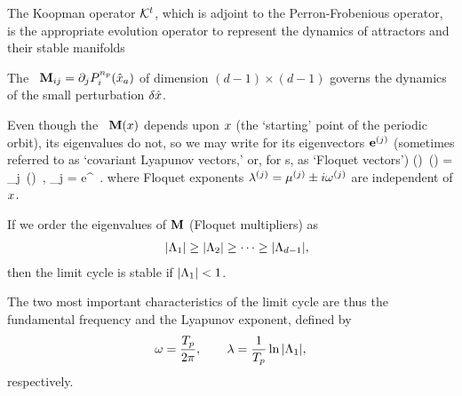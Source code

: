 The Koopman operator $\Uop^t$, which is
adjoint to the Perron-Frobenious operator, is the appropriate evolution
operator to represent the dynamics of attractors and their stable
manifolds

The \monodromyM\  $\Mbf_{ij}=\partial_j \PoincM^{\cl{p}}_i(\sspRed_a)$
of dimension $(d-1)\times (d-1)$ governs the dynamics of the small
perturbation $\delta\sspRed$.

Even though the \jacobianM\ $\Mbf(\ssp)$
depends upon $\ssp$ (the `starting' point of the periodic
orbit),
its eigenvalues do not, so we may write for its
eigen\-vectors $\jEigvec[j]$
(sometimes referred to as `covariant Lyapunov vectors,'
or, for \po s, as `Floquet vectors')
\beq
\Mbf(\ssp)\, \jEigvec[j](\ssp)
   = \ExpaEig_{j} \,\jEigvec[j] (\ssp)
\,,\qquad
\ExpaEig_{j}
= %
e^{\eigExp[j]  }
\,.
where Floquet exponents $\eigExp[j] = \eigRe[j] \pm i\eigIm[j]$
are independent of $\ssp$.

If we order the eigenvalues of $\Mbf$
(Floquet multipliers) as
%
\begin{eqnarray}
&& |\ExpaEig_{1}| \geq |\ExpaEig_2|\geq \dots \geq|\ExpaEig_{d-1}|,
\label{eq:general:exponent}
\end{eqnarray}
%
then the limit cycle is stable if  $|\ExpaEig_{1}|<1$.


The
two most important characteristics of the limit cycle are  thus the
fundamental frequency and the  Lyapunov exponent,
defined  by
\begin{equation}
\omega = \frac{\period{p}}{2\pi}, \qquad
\Lyap=\frac{1}{\period{p}}\ln|\ExpaEig_1|,
\label{eq:lyap:fund}
\end{equation}
%
respectively.


